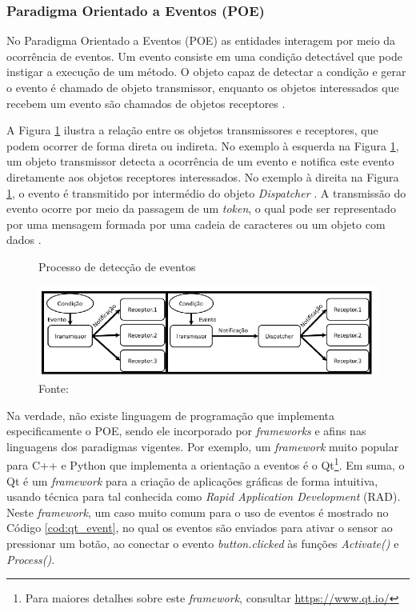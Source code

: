 \subsubsection{Paradigma Orientado a Eventos (POE)}\label{sec:poe}

No Paradigma Orientado a Eventos (POE) as entidades interagem por meio da
ocorrência de eventos. Um evento consiste em uma condição detectável que pode
instigar a execução de um método. O objeto capaz de detectar a condição e gerar
o evento é chamado de objeto transmissor, enquanto os objetos interessados que
recebem um evento são chamados de objetos receptores \cite{ferg_2006}.

A Figura \ref{fig:eventos} ilustra a relação entre os objetos transmissores e
receptores, que podem ocorrer de forma direta ou indireta. No exemplo à esquerda
na Figura \ref{fig:eventos}, um objeto transmissor detecta a ocorrência de um
evento e notifica este evento diretamente aos objetos receptores interessados.
No exemplo à direita na Figura \ref{fig:eventos}, o evento é transmitido por
intermédio do objeto \textit{Dispatcher} \cite{msc_xavier_2014}. A transmissão
do evento ocorre por meio da passagem de um \textit{token}, o qual pode ser
representado por uma mensagem formada por uma cadeia de caracteres ou um objeto
com dados \cite{ferg_2006}.

\begin{figure}[!htb]
  \centering
  \caption{Processo de detecção de eventos}
  \includegraphics[width=\textwidth]{../figures/eventos.png}
  \caption*{Fonte: }
  \label{fig:eventos}
\end{figure}
\FloatBarrier

Na verdade, não existe linguagem de programação que implementa especificamente o
POE, sendo ele incorporado por \textit{frameworks} e afins nas linguagens dos
paradigmas vigentes. Por exemplo, um \textit{framework} muito popular para C++ e
Python que implementa a orientação a eventos é o Qt\footnote{Para maiores
  detalhes sobre este \textit{framework}, consultar \url{https://www.qt.io/}}. Em
suma, o Qt é um \textit{framework} para a criação de aplicações gráficas de
forma intuitiva, usando técnica para tal conhecida como \textit{Rapid
  Application Development} (RAD). Neste \textit{framework}, um caso muito comum
para o uso de eventos é mostrado no Código \ref{cod:qt_event}, no qual os
eventos são enviados para ativar o sensor ao pressionar um botão, ao conectar o
evento \textit{button.clicked} às funções \textit{Activate()} e
\textit{Process()}.

